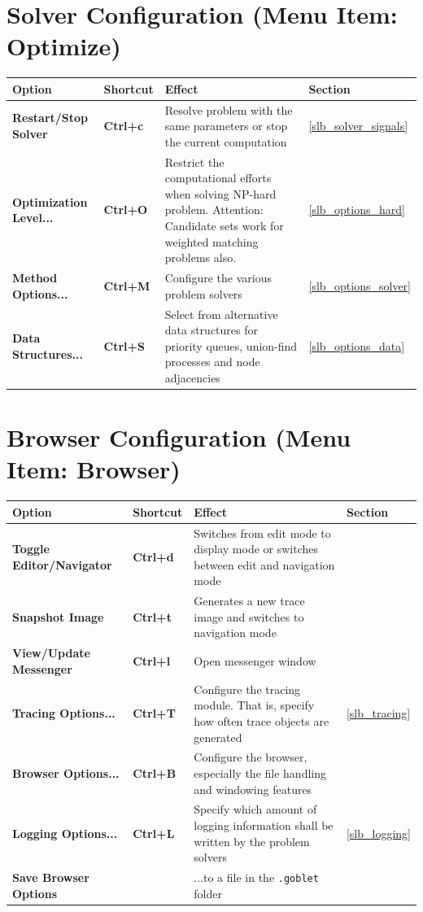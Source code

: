 \documentclass[a4paper,11pt,twoside]{book}
\begin{document}
\vfill
\bigskip
\section{Solver Configuration (Menu Item: Optimize)}

\begin{tabular}{p{4cm}|p{2cm}|p{17cm}|p{1.5cm}} 
\large\bf Option & \large\bf Shortcut & \large\bf Effect & \large\bf Section \\
[1mm] \hline \hline
\bf  Restart/Stop Solver &\bf Ctrl+c &
     Resolve problem with the same parameters or stop the current computation &
     \ref{slb_solver_signals} \\ \hline
\bf  Optimization Level... &\bf Ctrl+O &
     Restrict the computational efforts when solving NP-hard problem.
     Attention: Candidate sets work for weighted matching problems also. &
     \ref{slb_options_hard} \\ \hline
\bf  Method Options... &\bf Ctrl+M &
     Configure the various problem solvers &
     \ref{slb_options_solver} \\ \hline
\bf  Data Structures... &\bf Ctrl+S&
     Select from alternative data structures for priority queues, union-find
     processes and node adjacencies &
     \ref{slb_options_data}
\end{tabular}

\vspace*{1cm}
\section{Browser Configuration (Menu Item: Browser)}

\begin{tabular}{p{5cm}|p{2cm}|p{16cm}|p{1.5cm}} 
\large\bf Option & \large\bf Shortcut & \large\bf Effect & \large\bf Section \\
[1mm] \hline \hline
\bf  Toggle Editor/Navigator &\bf Ctrl+d &
     Switches from edit mode to display mode or switches between edit and
     navigation mode \\ \hline
\bf  Snapshot Image &\bf Ctrl+t &
     Generates a new trace image and switches to navigation mode \\ \hline
\bf  View/Update Messenger &\bf Ctrl+l &
     Open messenger window \\ \hline
\bf  Tracing Options... &\bf Ctrl+T &
     Configure the tracing module. That is, specify how often trace objects
     are generated &
     \ref{slb_tracing} \\ \hline
\bf  Browser Options... &\bf Ctrl+B &
     Configure the browser, especially the file handling and
     windowing features \\ \hline
\bf  Logging Options... &\bf Ctrl+L &
     Specify which amount of logging information shall be written by
     the problem solvers &
     \ref{slb_logging} \\ \hline
\bf  Save Browser Options &\bf & ...to a file in the \verb/.goblet/ folder
\end{tabular}
\end{document}
